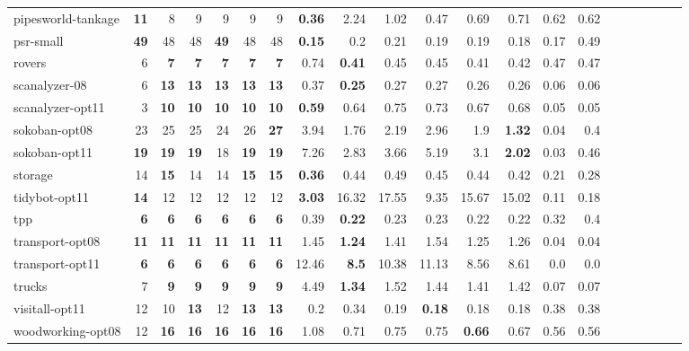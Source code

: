 \begin{table}[h!]
{\begin{tabular}{|l|r|r|r|r|r|r||r|r|r|r|r|r||r|r|r|r|r|r||r|r|}
pipesworld-tankage & \textbf{11} & 8 & 9 & 9 & 9 & 9 & \textbf{0.36} & 2.24 & 1.02 & 0.47 & 0.69 & 0.71 & 0.62 & 0.62 \\
psr-small & \textbf{49} & 48 & 48 & \textbf{49} & 48 & 48 & \textbf{0.15} & 0.2 & 0.21 & 0.19 & 0.19 & 0.18 & 0.17 & 0.49 \\
rovers & 6 & \textbf{7} & \textbf{7} & \textbf{7} & \textbf{7} & \textbf{7} & 0.74 & \textbf{0.41} & 0.45 & 0.45 & 0.41 & 0.42 & 0.47 & 0.47 \\
scanalyzer-08 & 6 & \textbf{13} & \textbf{13} & \textbf{13} & \textbf{13} & \textbf{13} & 0.37 & \textbf{0.25} & 0.27 & 0.27 & 0.26 & 0.26 & 0.06 & 0.06 \\
scanalyzer-opt11 & 3 & \textbf{10} & \textbf{10} & \textbf{10} & \textbf{10} & \textbf{10} & \textbf{0.59} & 0.64 & 0.75 & 0.73 & 0.67 & 0.68 & 0.05 & 0.05 \\
sokoban-opt08 & 23 & 25 & 25 & 24 & 26 & \textbf{27} & 3.94 & 1.76 & 2.19 & 2.96 & 1.9 & \textbf{1.32} & 0.04 & 0.4 \\
sokoban-opt11 & \textbf{19} & \textbf{19} & \textbf{19} & 18 & \textbf{19} & \textbf{19} & 7.26 & 2.83 & 3.66 & 5.19 & 3.1 & \textbf{2.02} & 0.03 & 0.46 \\
storage & 14 & \textbf{15} & 14 & 14 & \textbf{15} & \textbf{15} & \textbf{0.36} & 0.44 & 0.49 & 0.45 & 0.44 & 0.42 & 0.21 & 0.28 \\
tidybot-opt11 & \textbf{14} & 12 & 12 & 12 & 12 & 12 & \textbf{3.03} & 16.32 & 17.55 & 9.35 & 15.67 & 15.02 & 0.11 & 0.18 \\
tpp & \textbf{6} & \textbf{6} & \textbf{6} & \textbf{6} & \textbf{6} & \textbf{6} & 0.39 & \textbf{0.22} & 0.23 & 0.23 & 0.22 & 0.22 & 0.32 & 0.4 \\
transport-opt08 & \textbf{11} & \textbf{11} & \textbf{11} & \textbf{11} & \textbf{11} & \textbf{11} & 1.45 & \textbf{1.24} & 1.41 & 1.54 & 1.25 & 1.26 & 0.04 & 0.04 \\
transport-opt11 & \textbf{6} & \textbf{6} & \textbf{6} & \textbf{6} & \textbf{6} & \textbf{6} & 12.46 & \textbf{8.5} & 10.38 & 11.13 & 8.56 & 8.61 & 0.0 & 0.0 \\
trucks & 7 & \textbf{9} & \textbf{9} & \textbf{9} & \textbf{9} & \textbf{9} & 4.49 & \textbf{1.34} & 1.52 & 1.44 & 1.41 & 1.42 & 0.07 & 0.07 \\
visitall-opt11 & 12 & 10 & \textbf{13} & 12 & \textbf{13} & \textbf{13} & 0.2 & 0.34 & 0.19 & \textbf{0.18} & 0.18 & 0.18 & 0.38 & 0.38 \\
woodworking-opt08 & 12 & \textbf{16} & \textbf{16} & \textbf{16} & \textbf{16} & \textbf{16} & 1.08 & 0.71 & 0.75 & 0.75 & \textbf{0.66} & 0.67 & 0.56 & 0.56 \\

\end{tabular}}
\end{table}
